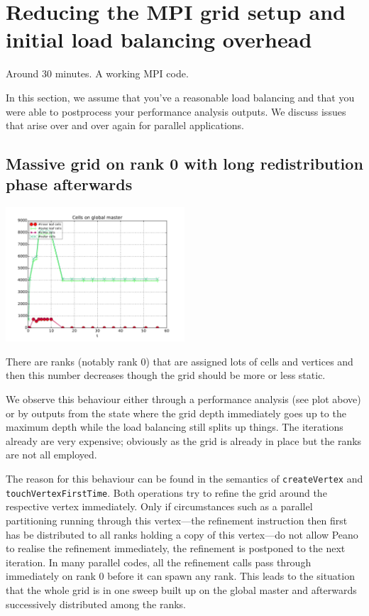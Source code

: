\section{Reducing the MPI grid setup and initial load balancing overhead}


\chapterDescription
  {
    Around 30 minutes.
  }
  {
    A working MPI code.
  }


In this section, we assume that you've a reasonable load balancing and that you
were able to postprocess your performance analysis outputs. We discuss issues
that arise over and over again for parallel applications.


\subsection{Massive grid on rank 0 with long redistribution phase
afterwards}

\begin{center}
  \includegraphics[width=0.5\textwidth]{61_mpi-setup/performance-analysis-output.pdf}
\end{center}


\begin{smell}
There are ranks (notably rank 0) that are assigned lots of cells and vertices
and then this number decreases though the grid should be more or less static.
\end{smell}

\noindent
We observe this behaviour either through a performance analysis (see plot above)
or by outputs from the state where the grid depth immediately goes up to the
maximum depth while the load balancing still splits up things. 
The iterations already are very expensive; obviously as the grid is already in
place but the ranks are not all employed.


The reason for this behaviour can be found in the semantics of
\texttt{createVertex} and \linebreak
\texttt{touchVertexFirstTime}.
Both operations try to refine the grid around the respective vertex immediately. 
Only if circumstances such as a parallel partitioning running through this
vertex---the refinement instruction then first has be distributed to all ranks
holding a copy of this vertex---do not allow Peano to realise the refinement
immediately, the refinement is postponed to the next iteration.
In many parallel codes, all the refinement calls pass through immediately on
rank 0 before it can spawn any rank.
This leads to the situation that the whole grid is in one sweep built up on the
global master and afterwards successively distributed among the ranks.


